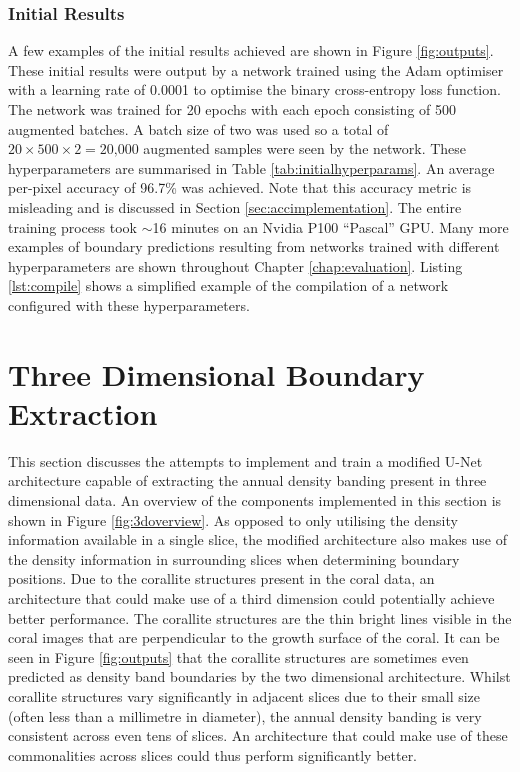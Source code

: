 \subsubsection{Initial Results}

A few examples of the initial results achieved are shown in Figure \ref{fig:outputs}. These initial results were output by a network trained using the Adam optimiser~\cite{adam} with a learning rate of 0.0001 to optimise the binary cross-entropy loss function. The network was trained for 20 epochs with each epoch consisting of 500 augmented batches. A batch size of two was used so a total of $20\times500\times2=\text{20,000}$ augmented samples were seen by the network. These hyperparameters are summarised in Table \ref{tab:initialhyperparams}. An average per-pixel accuracy of 96.7\% was achieved. Note that this accuracy metric is misleading and is discussed in Section \ref{sec:accimplementation}. The entire training process took ${\sim}$16 minutes on an Nvidia P100 ``Pascal'' GPU. Many more examples of boundary predictions resulting from networks trained with different hyperparameters are shown throughout Chapter \ref{chap:evaluation}. Listing \ref{lst:compile} shows a simplified example of the compilation of a network configured with these hyperparameters.

\section{Three Dimensional Boundary Extraction}
\label{sec:threedimension}

This section discusses the attempts to implement and train a modified U-Net architecture capable of extracting the annual density banding present in three dimensional data. An overview of the components implemented in this section is shown in Figure \ref{fig:3doverview}. As opposed to only utilising the density information available in a single slice, the modified architecture also makes use of the density information in surrounding slices when determining boundary positions. Due to the corallite structures present in the coral data, an architecture that could make use of a third dimension could potentially achieve better performance. The corallite structures are the thin bright lines visible in the coral images that are perpendicular to the growth surface of the coral. It can be seen in Figure \ref{fig:outputs} that the corallite structures are sometimes even predicted as density band boundaries by the two dimensional architecture. Whilst corallite structures vary significantly in adjacent slices due to their small size (often less than a millimetre in diameter), the annual density banding is very consistent across even tens of slices. An architecture that could make use of these commonalities across slices could thus perform significantly better.

